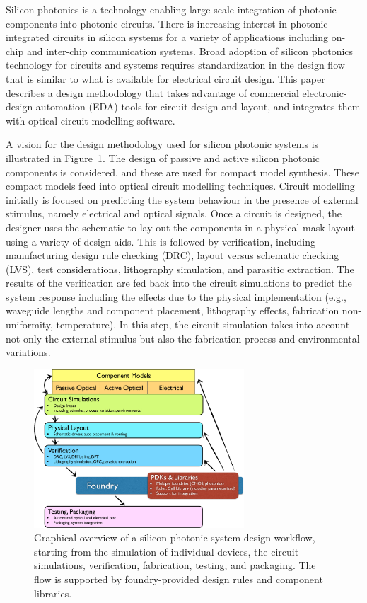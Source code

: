 \documentclass[journal]{spie}
\begin{document}
Silicon photonics is a technology enabling large-scale integration of photonic components into photonic circuits.  
There is increasing interest in photonic integrated circuits in silicon systems for a variety of applications including on-chip and inter-chip communication systems. Broad adoption of silicon photonics technology for circuits and systems requires standardization in the design flow that is similar to what is available for electrical circuit design. This paper describes a design methodology that takes advantage of commercial electronic-design automation (EDA) tools for circuit design and layout, and integrates them with optical circuit modelling software. 


A vision for the design methodology used for silicon photonic systems is illustrated in Figure~\ref{SiliconPhotonicsDesign_Overview}. 
The design of passive and active silicon photonic components is considered, and these are used for compact model synthesis.  These compact models feed into optical circuit modelling techniques.  Circuit modelling initially is focused on predicting the system behaviour in the presence of external stimulus, namely electrical and optical signals. Once a circuit is designed, the designer uses the schematic to lay out the components in a physical mask layout using a variety of design aids.  This is followed by verification, including manufacturing design rule checking (DRC), layout versus schematic checking (LVS), test considerations, lithography simulation, and parasitic extraction.  The results of the verification are fed back into the circuit simulations to predict the system response including the effects due to the physical implementation (e.g., waveguide lengths and component placement, lithography effects, fabrication non-uniformity, temperature).  In this step, the circuit simulation takes into account not only the external stimulus but also the fabrication process and environmental variations.


\begin{figure}[tbp]
	\centering
    	\includegraphics[width=0.7\textwidth]{../figs/SiliconPhotonicsDesign_Overview-crop.pdf}
        \caption[]{Graphical overview of a silicon photonic system design workflow, starting from the simulation of individual devices, the circuit simulations, verification, fabrication, testing, and packaging.  The flow is supported by foundry-provided design rules and component libraries. 
}
        \label{SiliconPhotonicsDesign_Overview}
\end{figure}
\end{document}

